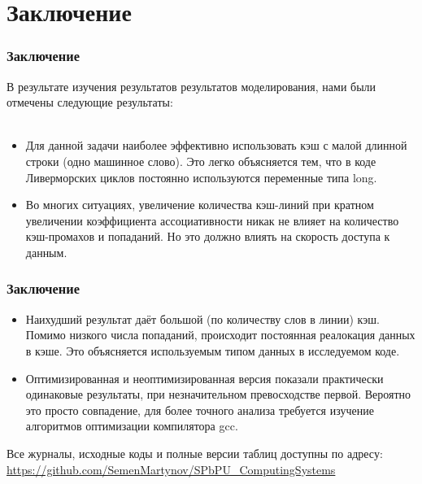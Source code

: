\documentclass{beamer}
\begin{document}
\section{Заключение}

\begin{frame}
\frametitle{Заключение}

В результате изучения результатов результатов моделирования, нами были отмечены следующие результаты:\\~\\

\begin{itemize}
\item Для данной задачи наиболее эффективно использовать кэш с малой длинной строки (одно машинное слово). Это легко объясняется тем, что в коде Ливерморских циклов постоянно используются переменные типа long.
\item Во многих ситуациях, увеличение количества кэш-линий при кратном увеличении коэффициента ассоциативности никак не влияет на количество кэш-промахов и попаданий. Но это должно влиять на скорость доступа к данным.
\end{itemize}


\end{frame}


\begin{frame}
\frametitle{Заключение}

\begin{itemize}
\item Наихудший результат даёт большой (по количеству слов в линии) кэш. Помимо низкого числа попаданий, происходит постоянная реалокация данных в кэше. Это объясняется используемым типом данных в исследуемом коде.
\item Оптимизированная и неоптимизированная версия показали практически одинаковые результаты, при незначительном превосходстве первой. Вероятно это просто совпадение, для более точного анализа требуется изучение алгоритмов оптимизации компилятора gcc.
\end{itemize}

Все журналы, исходные коды и полные версии таблиц доступны по адресу: \url{https://github.com/SemenMartynov/SPbPU_ComputingSystems}

\end{frame}

\end{document}
